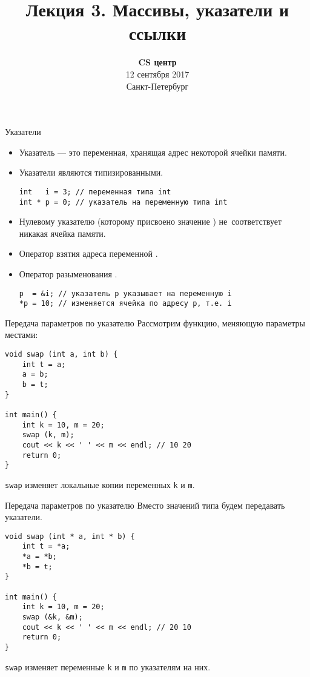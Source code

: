 \documentclass{beamer}
\title{Лекция 3. Массивы, указатели и ссылки}
\date{
   \textbf{CS центр}\\
   12 сентября 2017 \\
   Санкт-Петербург
}
\begin{document}
\begin{frame} 
  \titlepage
\end{frame}

\begin{frame}[fragile]{Указатели}
    \begin{itemize}
        \item Указатель — это переменная, хранящая адрес некоторой 
            ячейки памяти.
           
        \item Указатели являются типизированными.
\begin{lstlisting}
int   i = 3; // переменная типа int
int * p = 0; // указатель на переменную типа int
\end{lstlisting}
        
        \item Нулевому указателю (которому присвоено значение ) не~соответствует никакая ячейка памяти.

        \item Оператор взятия адреса переменной \code{\&}.

        \item Оператор разыменования \code{*}.

\begin{lstlisting}
p  = &i; // указатель p указывает на переменную i
*p = 10; // изменяется ячейка по адресу p, т.е. i
\end{lstlisting}
    \end{itemize}

\end{frame}

\begin{frame}[fragile]{Передача параметров по указателю}
Рассмотрим функцию, меняющую параметры местами:
\begin{lstlisting}
void swap (int a, int b) {
    int t = a;
    a = b;
    b = t;
}

int main() {
    int k = 10, m = 20;
    swap (k, m);
    cout << k << ' ' << m << endl; // 10 20
    return 0;
}
\end{lstlisting}

{\tt swap} изменяет локальные копии переменных {\tt k} и {\tt m}.
\end{frame}

\begin{frame}[fragile]{Передача параметров по указателю}
    Вместо значений типа  будем передавать указатели.
\begin{lstlisting}
void swap (int * a, int * b) {
    int t = *a;
    *a = *b;
    *b = t;
}

int main() {
    int k = 10, m = 20;
    swap (&k, &m);
    cout << k << ' ' << m << endl; // 20 10
    return 0;
}
\end{lstlisting}

{\tt swap} изменяет переменные {\tt k} и {\tt m} по указателям на них.
\end{frame}
\end{document}
